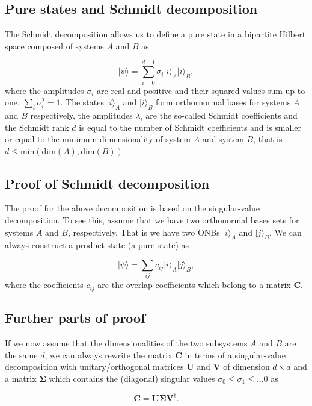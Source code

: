 \documentclass[%
oneside,                 %
final,                   %
10pt]{article}
\begin{document}
\subsection{Pure states and Schmidt decomposition}

The Schmidt decomposition allows us to define a pure state in a
bipartite Hilbert space composed of systems $A$ and $B$ as

\[
\vert\psi\rangle=\sum_{i=0}^{d-1}\sigma_i\vert i\rangle_A\vert i\rangle_B,
\]
where the amplitudes $\sigma_i$ are real and positive and their
squared values sum up to one, $\sum_i\sigma_i^2=1$. The states $\vert
i\rangle_A$ and $\vert i\rangle_B$ form orthornormal bases for systems
$A$ and $B$ respectively, the amplitudes $\lambda_i$ are the so-called
Schmidt coefficients and the Schmidt rank $d$ is equal to the number
of Schmidt coefficients and is smaller or equal to the minimum
dimensionality of system $A$ and system $B$, that is $d\leq
\mathrm{min}(\mathrm{dim}(A), \mathrm{dim}(B))$.

\subsection{Proof of Schmidt decomposition}

The proof for the above decomposition is based on the singular-value
decomposition. To see this, assume that we have two orthonormal bases
sets for systems $A$ and $B$, respectively. That is we have two ONBs
$\vert i\rangle_A$ and $\vert j\rangle_B$. We can always construct a
product state (a pure state) as

\[ \vert\psi \rangle = \sum_{ij} c_{ij}\vert i\rangle_A\vert
j\rangle_B,
\]
where the coefficients $c_{ij}$ are the overlap coefficients which
belong to a matrix $\bm{C}$.

\subsection{Further parts of proof}

If we now assume that the
dimensionalities of the two subsystems $A$ and $B$ are the same $d$,
we can always rewrite the matrix $\bm{C}$ in terms of a singular-value
decomposition with unitary/orthogonal matrices $\bm{U}$ and $\bm{V}$
of dimension $d\times d$ and a matrix $\bm{\Sigma}$ which contains the
(diagonal) singular values $\sigma_0\leq \sigma_1 \leq \dots 0$ as

\[
\bm{C}=\bm{U}\bm{\Sigma}\bm{V}^{\dagger}.
\]
\end{document}
